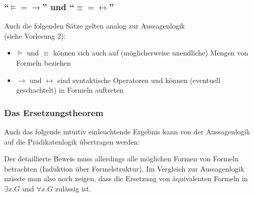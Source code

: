 \documentclass[aspectratio=1610,onlymath]{beamer}
\begin{document}
\begin{frame}\frametitle{"`${\models} = {\to}$"' und "`${\equiv}={\leftrightarrow}$"'}

Auch die folgenden Sätze gelten analog zur Aussagenlogik\\ (siehe Vorlesung 2):\bigskip

\bigskip

\bigskip

\bigskip

\begin{itemize}
\item $\models$ und $\equiv$ können sich auch auf (möglicherweise unendliche) Mengen von Formeln beziehen
\item $\to$ und $\leftrightarrow$ sind syntaktische Operatoren und können (eventuell geschachtelt) in Formeln auftreten
\end{itemize}

\end{frame}

\begin{frame}\frametitle{Das Ersetzungstheorem}

Auch das folgende intuitiv einleuchtende Ergebnis kann von der Aussagenlogik auf
die Prädikatenlogik übertragen werden:\bigskip

\bigskip

Der detaillierte Beweis muss allerdings alle möglichen Formen von
Formeln betrachten (Induktion über Formelstruktur). Im Vergleich zur
Aussagenlogik müsste man also noch zeigen, dass die Ersetzung von
äquivalenten Formeln in $\exists x.G$ und $\forall x.G$ zulässig ist.

\end{frame}
\end{document}
